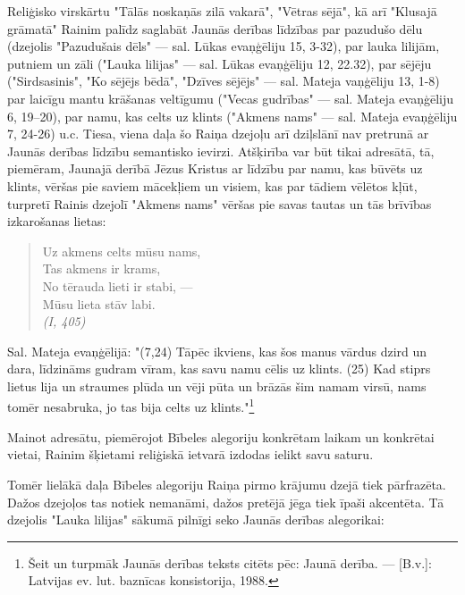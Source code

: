 \documentclass[11pt]{article}
\begin{document}
Reliģisko virskārtu "Tālās noskaņās zilā vakarā",
"Vētras sējā", kā arī "Klusajā grāmatā" Rainim
palīdz saglabāt Jaunās derības līdzības par pazudušo dēlu
(dzejolis "Pazudušais dēls" --- sal. Lūkas evaņģēliju 15, 3-32),
par lauka lilijām, putniem un zāli ("Lauka lilijas"
--- sal. Lūkas evaņģēliju 12, 22.32), par sējēju
("Sirdsasinis", "Ko sējējs bēdā", "Dzīves sējējs" ---
sal. Mateja vaņģēliju 13, 1-8) par laicīgu mantu
krāšanas veltīgumu ("Vecas gudrības" --- sal.
Mateja evaņģēliju 6, 19--20), par namu, kas celts
uz klints ("Akmens nams" --- sal. Mateja
evaņģēliju 7, 24-26) u.c. Tiesa, viena daļa šo
Raiņa dzejoļu arī dziļslānī nav pretrunā ar Jaunās
derības līdzību semantisko ievirzi. Atšķirība var būt tikai
adresātā, tā, piemēram, Jaunajā derībā Jēzus Kristus ar
līdzību par namu, kas būvēts uz klints, vēršas pie saviem mācekļiem
un visiem, kas par tādiem vēlētos kļūt,
turpretī Rainis dzejolī "Akmens nams" vēršas pie savas
tautas un tās brīvības izkarošanas lietas:

\begin{quote}
Uz akmens celts mūsu nams,\\
Tas akmens ir krams,\\
No tērauda lieti ir stabi, ---\\
Mūsu lieta stāv labi.\\
{\em (I, 405)}
\end{quote}

Sal. Mateja evaņģēlijā: "(7,24) Tāpēc ikviens, kas šos
manus vārdus dzird un dara, līdzināms gudram vīram, kas
savu namu cēlis uz klints. (25) Kad stiprs lietus lija
un straumes plūda un vēji pūta un brāzās šim namam
virsū, nams tomēr nesabruka, jo tas bija celts uz
klints."\footnote{Šeit un turpmāk Jaunās derības teksts
citēts pēc: Jaunā derība. --- [B.v.]: Latvijas ev. lut.
baznīcas konsistorija, 1988.}

Mainot adresātu, piemērojot Bībeles alegoriju konkrētam
laikam un konkrētai vietai, Rainim šķietami reliģiskā ietvarā izdodas
ielikt savu saturu.

Tomēr lielākā daļa Bībeles alegoriju Raiņa pirmo krājumu
dzejā tiek pārfrazēta. Dažos dzejoļos tas notiek
nemanāmi, dažos pretējā jēga tiek īpaši akcentēta.
Tā dzejolis "Lauka lilijas" sākumā pilnīgi seko
Jaunās derības alegorikai:
\end{document}
